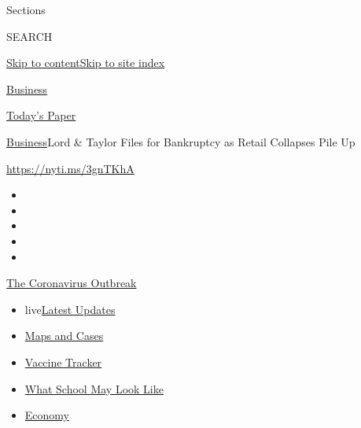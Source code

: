 Sections

SEARCH

\protect\hyperlink{site-content}{Skip to
content}\protect\hyperlink{site-index}{Skip to site index}

\href{https://www.nytimes3xbfgragh.onion/section/business}{Business}

\href{https://myaccount.nytimes3xbfgragh.onion/auth/login?response_type=cookie\&client_id=vi}{}

\href{https://www.nytimes3xbfgragh.onion/section/todayspaper}{Today's
Paper}

\href{/section/business}{Business}\textbar{}Lord \& Taylor Files for
Bankruptcy as Retail Collapses Pile Up

\url{https://nyti.ms/3gnTKhA}

\begin{itemize}
\item
\item
\item
\item
\item
\end{itemize}

\href{https://www.nytimes3xbfgragh.onion/news-event/coronavirus?action=click\&pgtype=Article\&state=default\&region=TOP_BANNER\&context=storylines_menu}{The
Coronavirus Outbreak}

\begin{itemize}
\tightlist
\item
  live\href{https://www.nytimes3xbfgragh.onion/2020/08/02/world/coronavirus-updates.html?action=click\&pgtype=Article\&state=default\&region=TOP_BANNER\&context=storylines_menu}{Latest
  Updates}
\item
  \href{https://www.nytimes3xbfgragh.onion/interactive/2020/us/coronavirus-us-cases.html?action=click\&pgtype=Article\&state=default\&region=TOP_BANNER\&context=storylines_menu}{Maps
  and Cases}
\item
  \href{https://www.nytimes3xbfgragh.onion/interactive/2020/science/coronavirus-vaccine-tracker.html?action=click\&pgtype=Article\&state=default\&region=TOP_BANNER\&context=storylines_menu}{Vaccine
  Tracker}
\item
  \href{https://www.nytimes3xbfgragh.onion/interactive/2020/07/29/us/schools-reopening-coronavirus.html?action=click\&pgtype=Article\&state=default\&region=TOP_BANNER\&context=storylines_menu}{What
  School May Look Like}
\item
  \href{https://www.nytimes3xbfgragh.onion/live/2020/07/31/business/stock-market-today-coronavirus?action=click\&pgtype=Article\&state=default\&region=TOP_BANNER\&context=storylines_menu}{Economy}
\end{itemize}

